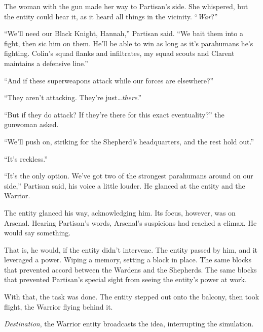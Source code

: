 The woman with the gun made her way to Partisan's side.  She whispered, but the entity could hear it, as it heard all things in the vicinity.  ``\emph{War}?''



``We'll need our Black Knight, Hannah,'' Partisan said.  ``We bait them into a fight, then sic him on them.  He'll be able to win as long as it's parahumans he's fighting.  Colin's squad flanks and infiltrates, my squad scouts and Clarent maintains a defensive line.''



``And if these superweapons attack while our forces are elsewhere?''



``They aren't attacking.  They're just\ldots \emph{there}.''



``But if they do attack?  If they're there for this exact eventuality?'' the gunwoman asked.



``We'll push on, striking for the Shepherd's headquarters, and the rest hold out.''



``It's reckless.''



``It's the only option.  We've got two of the strongest parahumans around on our side,'' Partisan said, his voice a little louder.  He glanced at the entity and the Warrior.



The entity glanced his way, acknowledging him.  Its focus, however, was on Arsenal.  Hearing Partisan's words, Arsenal's suspicions had reached a climax.  He would say something.



That is, he would, if the entity didn't intervene.  The entity passed by him, and it leveraged a power.  Wiping a memory, setting a block in place.  The same blocks that prevented accord between the Wardens and the Shepherds.  The same blocks that prevented Partisan's special sight from seeing the entity's power at work.



With that, the task was done.  The entity stepped out onto the balcony, then took flight, the Warrior flying behind it.



\sectionbreak



\emph{Destination}, the Warrior entity broadcasts the idea, interrupting the simulation.



